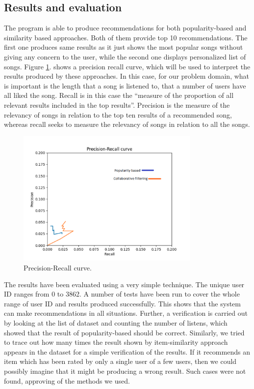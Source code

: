 \documentclass{jot}
\begin{document}
\subsection{Results and evaluation}
The program is able to produce recommendations for both popularity-based and similarity based approaches. Both of them provide top 10 recommendations. The first one produces same results as it just shows the most popular songs without giving any concern to the user, while the second one displays personalized  list of songs.
Figure \ref{fig:evaluation}. shows a precision recall curve, which will be used to interpret the results produced by these approaches. In this case, for our problem domain, what is important is the length that a song is listened to, that a number of users have all liked the song. Recall is in this case the “measure of the proportion of all relevant results included in the top results”. Precision is the measure  of the relevancy of songs in relation to the top ten results of a recommended song, whereas recall seeks to measure the relevancy of songs in relation to all the songs.\\

\begin{figure}[h!]
    \centering%
    \includegraphics[width=0.8\textwidth]{evaluation}
    \caption{Precision-Recall curve.}
    \label{fig:evaluation}
\end{figure}%

The results have been evaluated using a very simple technique. The unique user ID ranges from 0 to 3862. A number of tests have been run to cover the whole range of user ID and results produced successfully. This shows that the system can make recommendations in all situations. Further, a verification is carried out by looking at the list of dataset and counting the number of listens, which showed that the result of popularity-based should be correct.
Similarly, we tried to trace out how many times the result shown by item-similarity approach appears in the dataset for a simple verification of the results. If it recommends an item which has been rated by only a single user of a few users, then we could possibly imagine that it might be producing a wrong result. Such cases were not found, approving of the methods we used.
\end{document}
